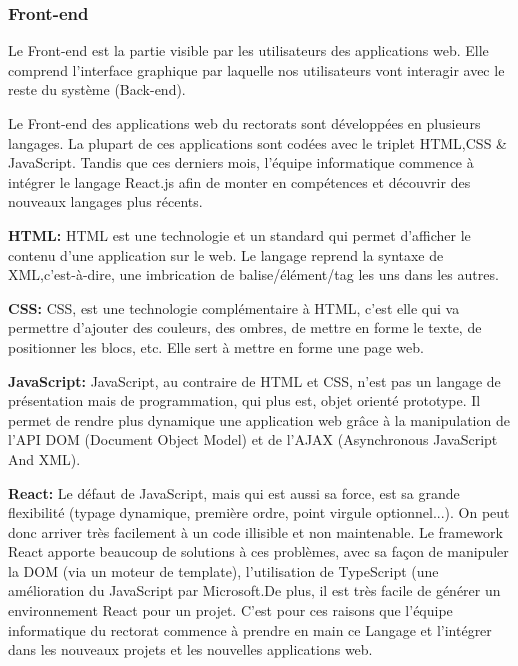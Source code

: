 \documentclass[a4paper]{article}
\begin{document}
\subsubsection{Front-end}
Le Front-end est la partie visible par les utilisateurs des applications web. Elle comprend l'interface graphique par laquelle nos utilisateurs vont interagir avec 
le reste du système (Back-end).


Le Front-end des applications web du rectorats sont développées en plusieurs langages. La plupart de ces applications  sont codées avec le triplet HTML,CSS \& JavaScript. Tandis que ces derniers mois, l'équipe informatique commence à intégrer le langage React.js  afin de monter en compétences et découvrir des nouveaux langages plus récents. 

\textbf{HTML:} HTML est une technologie et un standard qui permet d'afficher le contenu d'une application sur le web. Le langage reprend la syntaxe de XML,c'est-à-dire, une imbrication de balise/élément/tag les uns dans les autres.

\textbf{CSS:} CSS, est une technologie complémentaire à HTML, c'est elle qui va permettre d'ajouter des couleurs, des ombres, de mettre en forme le texte, de positionner les blocs, etc. Elle sert à mettre en forme une page web. 

\textbf{JavaScript:} JavaScript, au contraire de HTML et CSS, n'est pas un langage de présentation mais de programmation, qui plus est, objet orienté prototype. Il permet de rendre plus dynamique une application web grâce à la manipulation de l'API DOM (Document Object Model) et de l'AJAX (Asynchronous JavaScript And XML).

\textbf{React:} Le défaut de JavaScript, mais qui est aussi sa force, est sa grande flexibilité (typage dynamique, première ordre, point virgule optionnel...). On peut donc arriver très facilement à un code illisible et non maintenable. Le framework React apporte beaucoup de solutions à ces problèmes, avec sa façon de manipuler la DOM (via un moteur de template), l'utilisation de TypeScript (une amélioration du JavaScript par Microsoft.De plus, il est très facile de générer un environnement React pour un projet. C'est pour ces raisons que l'équipe informatique du rectorat commence à prendre en main ce Langage et l’intégrer dans les nouveaux projets et les nouvelles applications web. 
\end{document}
